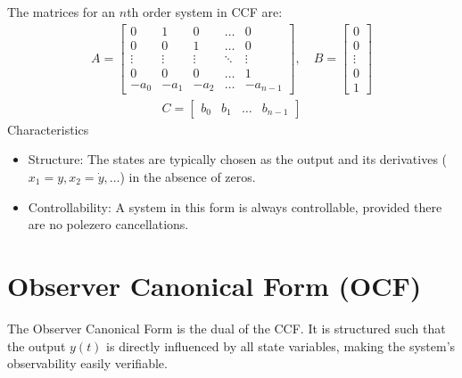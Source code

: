 \documentclass[letterpaper,10pt,english]{jupyterBook}
\begin{document}
\sphinxAtStartPar
{} The matrices for an \(n\)\sphinxhyphen{}th order system in CCF are:
\begin{equation*}
\begin{split}A = \begin{bmatrix} 
0 & 1 & 0 & \dots & 0 \\
0 & 0 & 1 & \dots & 0 \\
\vdots & \vdots & \vdots & \ddots & \vdots \\
0 & 0 & 0 & \dots & 1 \\
-a_0 & -a_1 & -a_2 & \dots & -a_{n-1}
\end{bmatrix}, \quad
B = \begin{bmatrix} 0 \\ 0 \\ \vdots \\ 0 \\ 1 \end{bmatrix}\end{split}
\end{equation*}\begin{equation*}
\begin{split}C = \begin{bmatrix} b_0 & b_1 & \dots & b_{n-1} \end{bmatrix}\end{split}
\end{equation*}
\sphinxAtStartPar
Characteristics
\begin{itemize}
\item {} 
\sphinxAtStartPar
Structure: The states are typically chosen as the output and its derivatives (\(x_1 = y, x_2 = \dot{y}, \dots\)) in the absence of zeros.

\item {} 
\sphinxAtStartPar
Controllability: A system in this form is always controllable, provided there are no pole\sphinxhyphen{}zero cancellations.

\end{itemize}


\section{Observer Canonical Form (OCF)}
\label{\detokenize{ch/system-theory/realizations:observer-canonical-form-ocf}}\label{\detokenize{ch/system-theory/realizations:system-theory-state-space-realizations-ocf}}
\sphinxAtStartPar
The Observer Canonical Form is the dual of the CCF. It is structured such that the output \(y(t)\) is directly influenced by all state variables, making the system’s observability easily verifiable.
\end{document}
